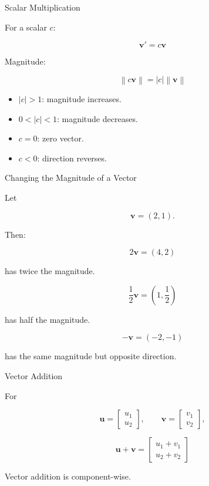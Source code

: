 \documentclass[aspectratio=169,11pt]{beamer}
\newcommand{\norm}[1]{\left\lVert #1\right\rVert}
\begin{document}
\begin{frame}{Scalar Multiplication}

For a scalar $c$:

\[
\boxed{
\mathbf v'=c\mathbf v
}
\]

Magnitude:

\[
\boxed{
\norm{c\mathbf v}
=
|c|\norm{\mathbf v}
}
\]

\begin{itemize}
    \item $|c|>1$: magnitude increases.
    \item $0<|c|<1$: magnitude decreases.
    \item $c=0$: zero vector.
    \item $c<0$: direction reverses.
\end{itemize}

\end{frame}

\begin{frame}{Changing the Magnitude of a Vector}

Let

\[
\mathbf v=(2,1).
\]

Then:

\[
2\mathbf v=(4,2)
\]

has twice the magnitude.

\[
\frac12\mathbf v=
\left(1,\frac12\right)
\]

has half the magnitude.

\[
-\mathbf v=(-2,-1)
\]

has the same magnitude but opposite direction.

\end{frame}

\begin{frame}{Vector Addition}

For

\[
\mathbf u=
\begin{bmatrix}
u_1\\u_2
\end{bmatrix},
\qquad
\mathbf v=
\begin{bmatrix}
v_1\\v_2
\end{bmatrix},
\]

\[
\boxed{
\mathbf u+\mathbf v
=
\begin{bmatrix}
u_1+v_1\\
u_2+v_2
\end{bmatrix}
}
\]

Vector addition is component-wise.

\end{frame}
\end{document}
